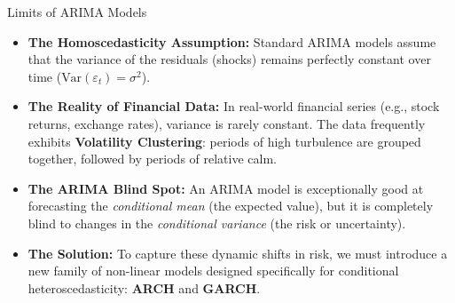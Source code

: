 \documentclass[aspectratio=169]{beamer}
\begin{document}
\begin{frame}{Limits of ARIMA Models}
\begin{itemize}
    \item \textbf{The Homoscedasticity Assumption:} Standard ARIMA models assume that the variance of the residuals (shocks) remains perfectly constant over time ($\text{Var}(\varepsilon_t) = \sigma^2$).
    
    \vspace{0.3cm}
    
    \item \textbf{The Reality of Financial Data:} In real-world financial series (e.g., stock returns, exchange rates), variance is rarely constant. The data frequently exhibits \textbf{Volatility Clustering}: periods of high turbulence are grouped together, followed by periods of relative calm.
    
    \vspace{0.3cm}
    
    \item \textbf{The ARIMA Blind Spot:} An ARIMA model is exceptionally good at forecasting the \textit{conditional mean} (the expected value), but it is completely blind to changes in the \textit{conditional variance} (the risk or uncertainty).
    
    \vspace{0.3cm}
    
    \item \textbf{The Solution:} To capture these dynamic shifts in risk, we must introduce a new family of non-linear models designed specifically for conditional heteroscedasticity: \textbf{ARCH} and \textbf{GARCH}.
\end{itemize}
\end{frame}
\end{document}

